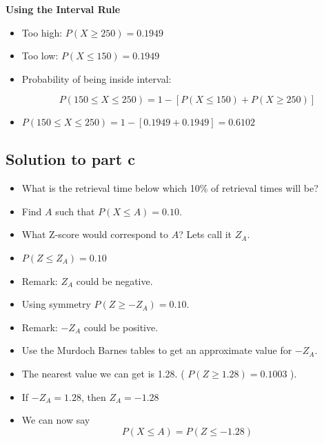\documentclass[a4paper,12pt]{article}
\begin{document}
	
	\textbf{Using the Interval Rule}
	\begin{itemize}
		\item Too high: $P( X \geq 250) = 0.1949 $
		\item Too low:  $P( X \leq 150) = 0.1949 $
		\item Probability of being inside interval:
		
		\[ P(150 \leq X \leq 250) = 1- [ P( X \leq 150) + P( X \geq 250)] \]
		
		\item $P(150 \leq X \leq 250) = 1- [ 0.1949 + 0.1949 ] = \boldsymbol{0.6102}$
		
	\end{itemize}	
	
\subsection*{Solution to part c}
	\begin{itemize}
		\item What is the retrieval time below which 10\% of retrieval times will be?
		\item Find $A$ such that $P(X \leq A) = 0.10$.
		\item What Z-score would correspond to $A$? Lets call it $Z_A$.
		\item $P(Z  \leq Z_A) = 0.10$
		\item Remark: $Z_A$ could be negative.
		\item Using symmetry $P(Z \geq -Z_A) = 0.10$.
		\item Remark: $-Z_A$ could be positive.
	\end{itemize}


	
	

	\begin{itemize}
		\item Use the Murdoch Barnes tables to get an approximate value for $-Z_A$.
		\item The nearest value we can get is 1.28. ( $P( Z \geq 1.28) = 0.1003$ ).
		\item If $-Z_A = 1.28$, then $Z_A=-1.28$
		\item We can now say
		\[ P(X \leq A) = P(Z \leq -1.28) \]
		
	\end{itemize}
\end{document}
